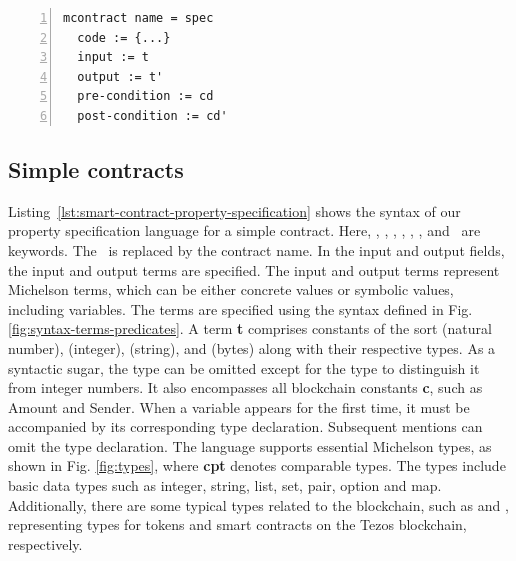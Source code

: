 \documentclass[a4paper,USenglish,cleveref, autoref, thm-restate]{lipics-v2021}
\begin{document}
\begin{lstlisting}[float=tp,captionpos=b,caption={Smart contract property specification for a simple contract},label={lst:smart-contract-property-specification},numbers=left]
mcontract name = spec
  code := {...}
  input := t
  output := t'
  pre-condition := cd
  post-condition := cd'
\end{lstlisting}

\subsection{Simple contracts}
\label{sec:simple-contracts}
Listing~\ref{lst:smart-contract-property-specification} shows the
syntax of our property specification language for a simple contract. Here, \KMCONTRACT,
\KSPEC, \KCODE, \KINPUT, \KOUTPUT, \KPRECONDI, and \KPOSTCONDI\ are
keywords. The \KNAME\ is replaced by the contract name. In the input
and output fields, the input and output terms are specified. The input and output terms represent Michelson terms, which can be either concrete values or symbolic values, including variables. The terms are specified using the syntax defined in Fig. \ref{fig:syntax-terms-predicates}. A term \textbf{t} comprises constants of the sort  (natural number),  (integer),  (string), and  (bytes) along with their respective types. As a syntactic sugar, the type can be omitted except for the type  to distinguish it from integer numbers. It also encompasses all blockchain constants \textbf{c}, such as Amount and Sender. When a variable appears for the first time, it must be accompanied by its corresponding type declaration. Subsequent mentions can omit the type declaration. The language supports essential Michelson types, as shown in Fig. \ref{fig:types}, where \textbf{cpt} denotes comparable types. The types include basic data types such as integer, string, list, set, pair, option and map. Additionally, there are some typical types related to the blockchain, such as  and , representing types for tokens and smart contracts on the Tezos blockchain, respectively.
\end{document}
